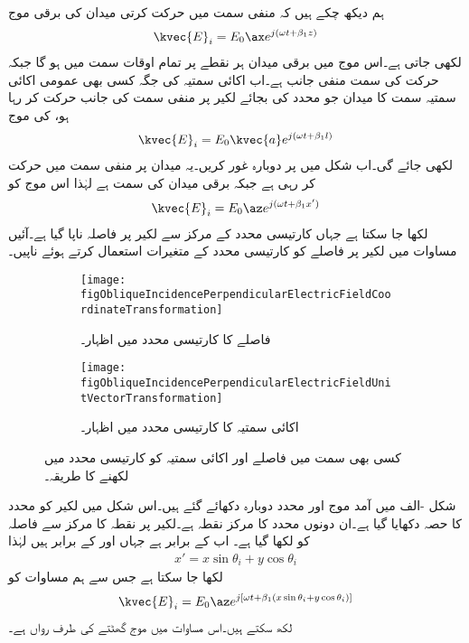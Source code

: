 ہم دیکھ چکے ہیں کہ منفی  سمت میں حرکت کرتی  میدان کی برقی موج
\begin{align*}
\kvec{E}_i=E_0 \ax e^{j(\omega t +\beta_1 z)}
\end{align*} 
لکھی جاتی ہے۔اس موج میں برقی میدان ہر نقطے پر تمام اوقات  سمت میں ہو گا جبکہ حرکت کی سمت منفی  جانب ہے۔اب  اکائی سمتیہ کی جگہ کسی بھی عمومی اکائی سمتیہ  سمت کا میدان جو  محدد کی بجائے لکیر  پر منفی سمت کی جانب حرکت کر رہا ہو، کی موج
\begin{align*}
\kvec{E}_i=E_0 \kvec{a} e^{j(\omega t +\beta_1 l)}
\end{align*} 
لکھی جائے گی۔اب شکل  میں  پر دوبارہ غور کریں۔یہ میدان  پر منفی سمت میں حرکت کر رہی ہے جبکہ برقی میدان  کی سمت  ہے  لہٰذا اس موج کو
\begin{align}\label{مساوات_ترچھا_آمد_ترچھی_کارتیسی}
\kvec{E}_i=E_0 \az e^{j(\omega t +\beta_1 x')}
\end{align}
لکھا جا سکتا ہے جہاں کارتیسی محدد  کے مرکز سے لکیر  پر فاصلہ ناپا گیا ہے۔آئیں مساوات  میں لکیر  پر فاصلے کو کارتیسی محدد  کے متغیرات استعمال کرتے ہوئے ناپیں۔
%
\begin{figure}
\centering
\begin{subfigure}{0.4\textwidth}
\centering
\texttt{[image: figObliqueIncidencePerpendicularElectricFieldCoordinateTransformation]}
\caption{فاصلے کا کارتیسی محدد میں اظہار۔}
\label{شکل_ترچھی_محدد_کی_تبدیلی}
\end{subfigure}
\begin{subfigure}{0.4\textwidth}
\centering
\texttt{[image: figObliqueIncidencePerpendicularElectricFieldUnitVectorTransformation]}
\caption{اکائی سمتیہ کا کارتیسی محدد میں اظہار۔}
\label{شکل_ترچھی_اکائی_سمتیہ}
\end{subfigure}
\caption{کسی بھی سمت میں فاصلے اور اکائی سمتیہ کو کارتیسی محدد میں لکھنے کا طریقہ۔}
\label{شکل_ترچھی_تبادلہ_فاصلہ_اور_اکائی_سمتیہ}
\end{figure}

شکل -الف میں آمد موج اور محدد  دوبارہ دکھائے گئے ہیں۔اس شکل میں لکیر  کو محدد  کا حصہ دکھایا گیا ہے۔ان دونوں محدد کا مرکز نقطہ  ہے۔لکیر  پر نقطہ  کا مرکز سے فاصلہ  کو  لکھا گیا ہے۔ اب  کے برابر ہے جہاں  اور  کے برابر ہیں لہٰذا
\begin{align}\label{مساوات_ترچھی_ترچھی_محدد_ایکس_کو_سیدھے_محدد_میں_لکھنا}
x'=x\sin \theta_i +y \cos \theta_i
\end{align} 
لکھا جا سکتا ہے جس سے ہم مساوات  کو
\begin{align}\label{مساوات_ترچھی_عمودی_برقی_آمدی}
\kvec{E}_i=E_0 \az e^{j[\omega t +\beta_1 (x\sin \theta_i +y \cos \theta_i)]}
\end{align}
لکھ سکتے ہیں۔اس مساوات میں موج  گھٹتے  کی طرف رواں ہے۔

